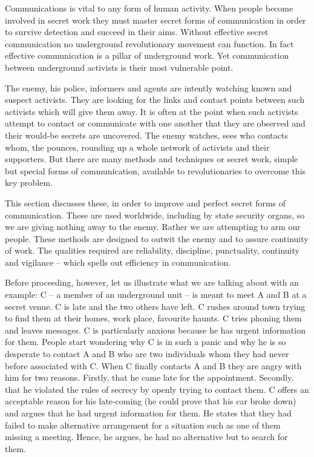 Communications is vital to any form of human activity. When people
become involved in secret work they must master secret forms of
communication in order to survive detection and succeed in their aims.
Without effective secret communication no underground revolutionary
movement can function. In fact effective communication is a pillar of
underground work. Yet communication between underground activists is
their most vulnerable point.

The enemy, his police, informers and agents are intently watching known
and suspect activists. They are looking for the links and contact points
between such activists which will give them away. It is often at the
point when such activists attempt to contact or communicate with one
another that they are observed and their would-be secrets are uncovered.
The enemy watches, sees who contacts whom, the pounces, rounding up a
whole network of activists and their supporters. But there are many
methods and techniques or secret work, simple but special forms of
communication, available to revolutionaries to overcome this key
problem.

This section discusses these, in order to improve and perfect secret
forms of communication. These are used worldwide, including by state
security organs, so we are giving nothing away to the enemy. Rather we
are attempting to arm our people. These methods are designed to outwit
the enemy and to assure continuity of work. The qualities required are
reliability, discipline, punctuality, continuity and vigilance -- which
spells out efficiency in communication.

Before proceeding, however, let us illustrate what we are talking about
with an example: C -- a member of an underground unit -- is meant to
meet A and B at a secret venue. C is late and the two others have left.
C rushes around town trying to find them at their homes, work place,
favourite haunts. C tries phoning them and leaves messages. C is
particularly anxious because he has urgent information for them. People
start wondering why C is in such a panic and why he is so desperate to
contact A and B who are two individuals whom they had never before
associated with C. When C finally contacts A and B they are angry with
him for two reasons. Firstly, that he came late for the appointment.
Secondly, that he violated the rules of secrecy by openly trying to
contact them. C offers an acceptable reason for his late-coming (he
could prove that his car broke down) and argues that he had urgent
information for them. He states that they had failed to make alternative
arrangement for a situation such as one of them missing a meeting.
Hence, he argues, he had no alternative but to search for them.

